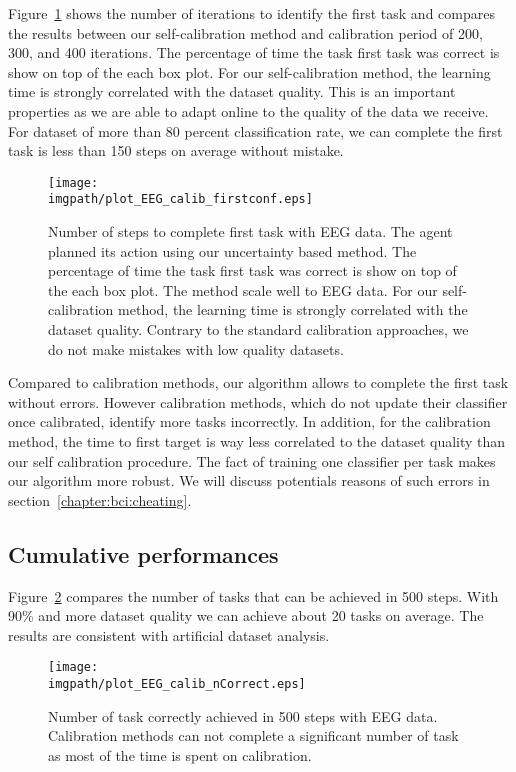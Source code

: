 Figure~\ref{fig:firstEEG} shows the number of iterations to identify the first task and compares the results between our self-calibration method and calibration period of 200, 300, and 400 iterations. The percentage of time the task first task was correct is show on top of the each box plot. For our self-calibration method, the learning time is strongly correlated with the dataset quality. This is an important properties as we are able to adapt online to the quality of the data we receive. For dataset of more than 80 percent classification rate, we can complete the first task is less than 150 steps on average without mistake.

\begin{figure}[!ht]
\centering
\texttt{[image: \\imgpath/plot\_EEG\_calib\_firstconf.eps]}
\caption{Number of steps to complete first task with EEG data. The agent planned its action using our uncertainty based method. The percentage of time the task first task was correct is show on top of the each box plot. The method scale well to EEG data. For our self-calibration method, the learning time is strongly correlated with the dataset quality. Contrary to the standard calibration approaches, we do not make mistakes with low quality datasets.}
\label{fig:firstEEG}
\end{figure} 

Compared to calibration methods, our algorithm allows to complete the first task without errors. However calibration methods, which do not update their classifier once calibrated, identify more tasks incorrectly. In addition, for the calibration method, the time to first target is way less correlated to the dataset quality than our self calibration procedure. The fact of training one classifier per task makes our algorithm more robust. We will discuss potentials reasons of such errors in section~\ref{chapter:bci:cheating}.

\subsection{Cumulative performances}

Figure~\ref{fig:nCorrectEEG} compares the number of tasks that can be achieved in 500 steps. With 90\% and more dataset quality we can achieve about 20 tasks on average. The results are consistent with artificial dataset analysis.

\begin{figure}[!ht]
\centering
\texttt{[image: \\imgpath/plot\_EEG\_calib\_nCorrect.eps]}
\caption{Number of task correctly achieved in 500 steps with EEG data. Calibration methods can not complete a significant number of task as most of the time is spent on calibration.}
\label{fig:nCorrectEEG}
\end{figure} 

